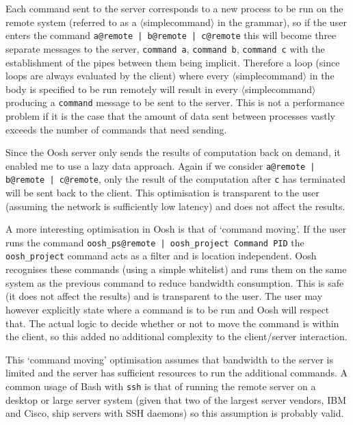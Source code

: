 \documentclass[12pt,twoside,notitlepage]{report}
\begin{document}
Each command sent to the server corresponds to a new process to be run
on the remote system (referred to as a $\langle$simplecommand$\rangle$
in the grammar), so if the user enters the command {\tt a@remote |
  b@remote | c@remote} this will become three separate messages to the
server, {\tt command a}, {\tt command b}, {\tt command c} with the
establishment of the pipes between them being implicit. Therefore a
loop (since loops are always evaluated by the client) where every
$\langle$simplecommand$\rangle$ in the body is specified to be run
remotely will result in every $\langle$simplecommand$\rangle$ producing a {\tt command}
message to be sent to the server. This is not a performance problem if
it is the case that the amount of data sent between processes vastly
exceeds the number of commands that need sending.

Since the Oosh server only sends the results of computation back on
demand, it enabled me to use a lazy data approach. Again if we
consider {\tt a@remote | b@remote | c@remote}, only the result of the
computation after {\tt c} has terminated will be sent back to the
client. This optimisation is transparent to the user (assuming the
network is sufficiently low latency) and does not
affect the results.

A more interesting optimisation in Oosh is that of `command
moving'. If the user runs the command {\tt oosh\_ps@remote |
  oosh\_project Command PID} the {\tt oosh\_project} command acts as a
filter and is location independent. Oosh recognises these commands
(using a simple whitelist) and runs them on the same system as the
previous command to reduce bandwidth consumption. This is safe (it
does not affect the results) and is transparent to the user. The user
may however explicitly state where a command is to be run and Oosh
will respect that. The actual logic to decide whether or not to move
the command is within the client, so this added no additional
complexity to the client/server interaction.

This `command moving' optimisation assumes that bandwidth to the
server is limited and the server has sufficient resources to run the
additional commands. A common usage of Bash with {\tt ssh} is that of
running the remote server on a desktop or large server system (given
that two of the largest server vendors, IBM and Cisco, ship servers
with SSH daemons) so this assumption is probably valid.
\end{document}
